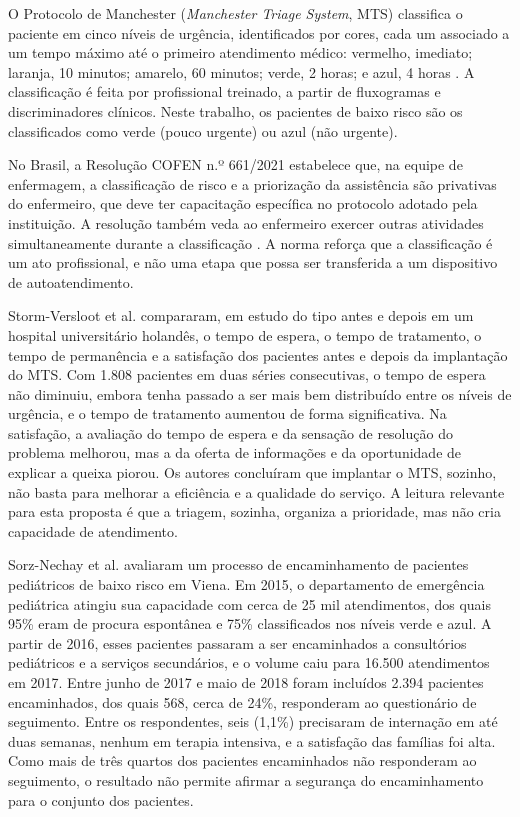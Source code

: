 \label{sec:ref-manchester}

O Protocolo de Manchester (\textit{Manchester Triage System}, MTS) classifica o paciente em cinco níveis de urgência, identificados por cores, cada um associado a um tempo máximo até o primeiro atendimento médico: vermelho, imediato; laranja, 10 minutos; amarelo, 60 minutos; verde, 2 horas; e azul, 4 horas \cite{stormversloot2014}. A classificação é feita por profissional treinado, a partir de fluxogramas e discriminadores clínicos. Neste trabalho, os pacientes de baixo risco são os classificados como verde (pouco urgente) ou azul (não urgente).

No Brasil, a Resolução COFEN n.º 661/2021 estabelece que, na equipe de enfermagem, a classificação de risco e a priorização da assistência são privativas do enfermeiro, que deve ter capacitação específica no protocolo adotado pela instituição. A resolução também veda ao enfermeiro exercer outras atividades simultaneamente durante a classificação \cite{cofen661}. A norma reforça que a classificação é um ato profissional, e não uma etapa que possa ser transferida a um dispositivo de autoatendimento.

Storm-Versloot et al. \cite{stormversloot2014} compararam, em estudo do tipo antes e depois em um hospital universitário holandês, o tempo de espera, o tempo de tratamento, o tempo de permanência e a satisfação dos pacientes antes e depois da implantação do MTS. Com 1.808 pacientes em duas séries consecutivas, o tempo de espera não diminuiu, embora tenha passado a ser mais bem distribuído entre os níveis de urgência, e o tempo de tratamento aumentou de forma significativa. Na satisfação, a avaliação do tempo de espera e da sensação de resolução do problema melhorou, mas a da oferta de informações e da oportunidade de explicar a queixa piorou. Os autores concluíram que implantar o MTS, sozinho, não basta para melhorar a eficiência e a qualidade do serviço. A leitura relevante para esta proposta é que a triagem, sozinha, organiza a prioridade, mas não cria capacidade de atendimento.

Sorz-Nechay et al. \cite{sorznechay2025} avaliaram um processo de encaminhamento de pacientes pediátricos de baixo risco em Viena. Em 2015, o departamento de emergência pediátrica atingiu sua capacidade com cerca de 25 mil atendimentos, dos quais 95\% eram de procura espontânea e 75\% classificados nos níveis verde e azul. A partir de 2016, esses pacientes passaram a ser encaminhados a consultórios pediátricos e a serviços secundários, e o volume caiu para 16.500 atendimentos em 2017. Entre junho de 2017 e maio de 2018 foram incluídos 2.394 pacientes encaminhados, dos quais 568, cerca de 24\%, responderam ao questionário de seguimento. Entre os respondentes, seis (1,1\%) precisaram de internação em até duas semanas, nenhum em terapia intensiva, e a satisfação das famílias foi alta. Como mais de três quartos dos pacientes encaminhados não responderam ao seguimento, o resultado não permite afirmar a segurança do encaminhamento para o conjunto dos pacientes.

